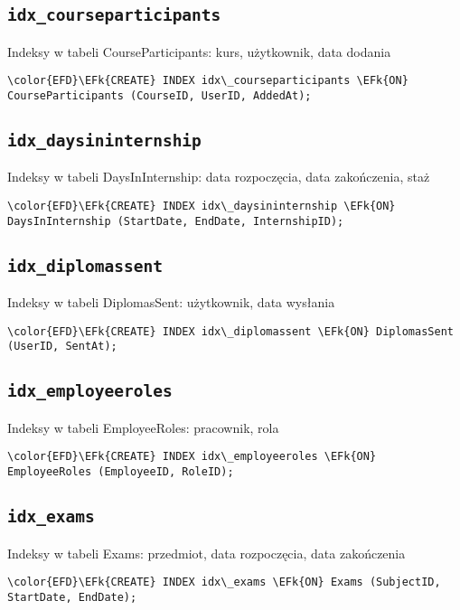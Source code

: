 \documentclass[11pt]{article}
\newcommand{\EFk}[1]{\textcolor{EFk}{\textbf{#1}}} %
\begin{document}
\subsection{\texttt{idx\_courseparticipants}}
\label{sec:org61bb2d8}
Indeksy w tabeli CourseParticipants: kurs, użytkownik, data dodania
\begin{Code}
\begin{Verbatim}
\color{EFD}\EFk{CREATE} INDEX idx\_courseparticipants \EFk{ON} CourseParticipants (CourseID, UserID, AddedAt);
\end{Verbatim}
\end{Code}
\subsection{\texttt{idx\_daysininternship}}
\label{sec:org631e5c5}
Indeksy w tabeli DaysInInternship: data rozpoczęcia, data zakończenia, staż
\begin{Code}
\begin{Verbatim}
\color{EFD}\EFk{CREATE} INDEX idx\_daysininternship \EFk{ON} DaysInInternship (StartDate, EndDate, InternshipID);
\end{Verbatim}
\end{Code}
\subsection{\texttt{idx\_diplomassent}}
\label{sec:orgedef52e}
Indeksy w tabeli DiplomasSent: użytkownik, data wysłania
\begin{Code}
\begin{Verbatim}
\color{EFD}\EFk{CREATE} INDEX idx\_diplomassent \EFk{ON} DiplomasSent (UserID, SentAt);
\end{Verbatim}
\end{Code}
\subsection{\texttt{idx\_employeeroles}}
\label{sec:org16b1453}
Indeksy w tabeli EmployeeRoles: pracownik, rola
\begin{Code}
\begin{Verbatim}
\color{EFD}\EFk{CREATE} INDEX idx\_employeeroles \EFk{ON} EmployeeRoles (EmployeeID, RoleID);
\end{Verbatim}
\end{Code}
\subsection{\texttt{idx\_exams}}
\label{sec:org307a97a}
Indeksy w tabeli Exams: przedmiot, data rozpoczęcia, data zakończenia
\begin{Code}
\begin{Verbatim}
\color{EFD}\EFk{CREATE} INDEX idx\_exams \EFk{ON} Exams (SubjectID, StartDate, EndDate);
\end{Verbatim}
\end{Code}
\end{document}
